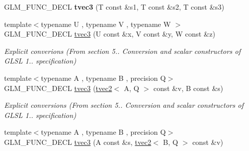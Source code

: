 \begin{DoxyCompactItemize}
\item 
G\+L\+M\+\_\+\+F\+U\+N\+C\+\_\+\+D\+E\+CL {\bfseries tvec3} (T const \&s1, T const \&s2, T const \&s3)\hypertarget{structglm_1_1detail_1_1tvec3_af282d8b360f521784a9a5a5240451aec}{}\label{structglm_1_1detail_1_1tvec3_af282d8b360f521784a9a5a5240451aec}

\item 
{\footnotesize template$<$typename U , typename V , typename W $>$ }\\G\+L\+M\+\_\+\+F\+U\+N\+C\+\_\+\+D\+E\+CL \hyperlink{structglm_1_1detail_1_1tvec3_aa1c2ac2585b673f7238017266ba427e9}{tvec3} (U const \&x, V const \&y, W const \&z)\hypertarget{structglm_1_1detail_1_1tvec3_aa1c2ac2585b673f7238017266ba427e9}{}\label{structglm_1_1detail_1_1tvec3_aa1c2ac2585b673f7238017266ba427e9}

\begin{DoxyCompactList}\small\item\em Explicit converions (From section 5.. Conversion and scalar constructors of G\+L\+SL 1.. specification) \end{DoxyCompactList}\item 
{\footnotesize template$<$typename A , typename B , precision Q$>$ }\\G\+L\+M\+\_\+\+F\+U\+N\+C\+\_\+\+D\+E\+CL \hyperlink{structglm_1_1detail_1_1tvec3_aa267579f4071920b9908f7ec7779cfe1}{tvec3} (\hyperlink{structglm_1_1detail_1_1tvec2}{tvec2}$<$ A, Q $>$ const \&v, B const \&s)\hypertarget{structglm_1_1detail_1_1tvec3_aa267579f4071920b9908f7ec7779cfe1}{}\label{structglm_1_1detail_1_1tvec3_aa267579f4071920b9908f7ec7779cfe1}

\begin{DoxyCompactList}\small\item\em Explicit conversions (From section 5.. Conversion and scalar constructors of G\+L\+SL 1.. specification) \end{DoxyCompactList}\item 
{\footnotesize template$<$typename A , typename B , precision Q$>$ }\\G\+L\+M\+\_\+\+F\+U\+N\+C\+\_\+\+D\+E\+CL \hyperlink{structglm_1_1detail_1_1tvec3_a0c479351c5b7c950e5470b8ed287997d}{tvec3} (A const \&s, \hyperlink{structglm_1_1detail_1_1tvec2}{tvec2}$<$ B, Q $>$ const \&v)\hypertarget{structglm_1_1detail_1_1tvec3_a0c479351c5b7c950e5470b8ed287997d}{}\label{structglm_1_1detail_1_1tvec3_a0c479351c5b7c950e5470b8ed287997d}


\end{DoxyCompactItemize}

